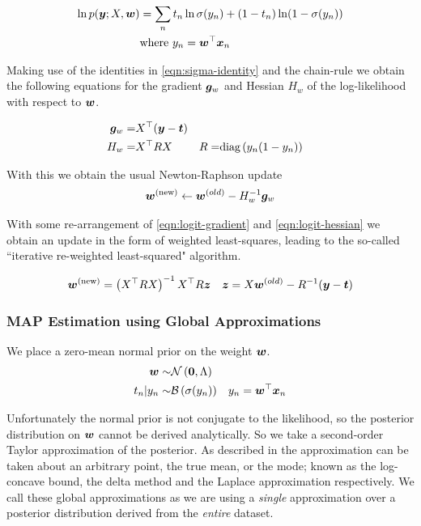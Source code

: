 \begin{align}
\ln p(\bm y; X, \bm w) & = \sum_n t_n \ln \sigma(y_n) + (1 - t_n) \ln (1 - \sigma(y_n)) \\
& \text{where } y_n = \bm w^\top\bm x_n
\end{align}

Making use of the identities in \eqref{eqn:sigma-identity} and the chain-rule we obtain the following equations for the gradient $\bm g_w$ and Hessian $H_w$ of the log-likelihood with respect to $\bm w$.

\begin{align}
\bm g_w = & X^\top (\bm y - \bm t) \label{eqn:logit-gradient}\\
H_w      = & X^\top R X & R = & \text{diag} \left( {y_n (1 - y_n)} \right) \label{eqn:logit-hessian}
\end{align}

With this we obtain the usual Newton-Raphson update
\begin{align}
\bm w^{(\text{new})} \leftarrow \bm w^{(old)} - H_w^{-1} \bm g_w
\end{align}

With some re-arrangement of \eqref{eqn:logit-gradient} and \eqref{eqn:logit-hessian} we obtain an update in the form of weighted least-squares, leading to the so-called ``iterative re-weighted least-squared" algorithm.

\begin{align}
\bm w^{(\text{new})} & = \left(X^\top R X \right)^{-1} X^\top R \bm z & \bm z = X \bm w^{(old)}-R^{-1}(\bm y - \bm t)
\end{align}


\subsubsection*{MAP Estimation using Global Approximations}
\newcommand \wmap[0] { \vv{w}_{\text{\tiny \sc MAP}} }

We place a zero-mean normal prior on the weight $\bm w$.
\begin{align}\bm w \sim & \mathcal{N} \left( {\bm 0}, {\Lambda} \right) \\
t_n | y_n \sim & \mathcal{B}\left( \sigma(y_n) \right) & y_n = \bm w^\top\bm x_n  \label{eqn:bayes-logit-model}
\end{align}

Unfortunately the normal prior is not conjugate to the likelihood, so the posterior distribution on $\bm w$ cannot be derived analytically. So we take a second-order Taylor approximation of the posterior. As described in \cite{Wang2013} the approximation can be taken about an arbitrary point, the true mean, or the mode; known as the log-concave bound, the delta method and the Laplace approximation respectively. We call these global approximations as we are using a \emph{single} approximation over a posterior distribution derived from the \emph{entire} dataset.

